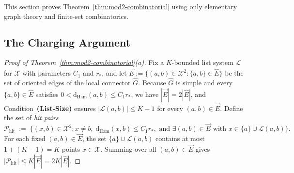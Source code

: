 \documentclass[11pt]{article}
\theoremstyle{definition}
\theoremstyle{remark}
\newcommand{\Ham}{\mathrm{Ham}}
\newcommand{\dHam}{\mathrm{d}_{\Ham}}
\begin{document}
This section proves Theorem~\ref{thm:mod2-combinatorial} using only elementary graph theory and finite-set combinatorics.

\subsection{The Charging Argument}
\label{subsec:charging}

\begin{proof}[Proof of Theorem~\ref{thm:mod2-combinatorial}(a)]
Fix a $K$-bounded list system $\mathcal{L}$ for $\mathcal{X}$ with parameters $C_1$ and $r_*$, and let $\vec{E} := \{(a, b) \in \mathcal{X}^2 : \{a, b\} \in \widehat{E}\}$ be the set of oriented edges of the local connector $\widehat{G}$. Because $\widehat{G}$ is simple and every $\{a, b\} \in \widehat{E}$ satisfies $0 < \dHam(a, b) \le C_1 r_*$, we have $|\vec{E}| = 2|\widehat{E}|$, and Condition~\textbf{(List-Size)} ensures $|\mathcal{L}(a, b)| \le K - 1$ for every $(a, b) \in \vec{E}$. Define the set of \emph{hit pairs}
\[
\mathcal{P}_{\mathrm{hit}} \;:=\; \bigl\{(x, b) \in \mathcal{X}^2 : x \ne b,\; \dHam(x, b) \le C_1 r_*,\text{ and }\exists (a, b) \in \vec{E}\text{ with } x \in \{a\} \cup \mathcal{L}(a, b)\bigr\}.
\]
For each fixed $(a, b) \in \vec{E}$, the set $\{a\} \cup \mathcal{L}(a, b)$ contains at most $1 + (K - 1) = K$ points $x \in \mathcal{X}$. Summing over all $(a, b) \in \vec{E}$ gives $|\mathcal{P}_{\mathrm{hit}}| \le K |\vec{E}| = 2 K |\widehat{E}|$.


\end{proof}
\end{document}
